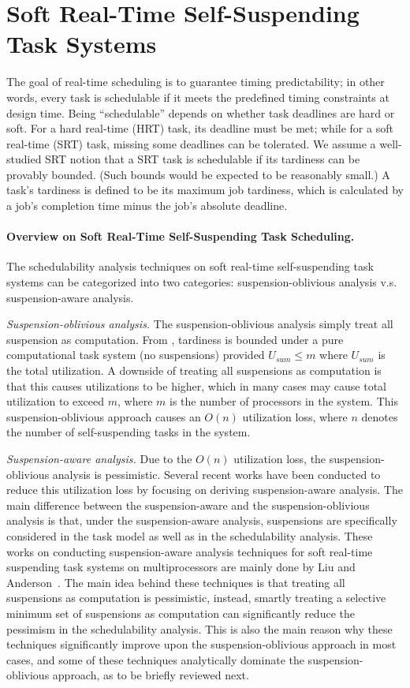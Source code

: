 \section{Soft Real-Time Self-Suspending Task Systems}

The goal of real-time scheduling is to guarantee timing predictability; in other words, every task is schedulable if it meets the predefined timing constraints at design time. Being ``schedulable'' depends on whether task deadlines are hard or soft. 
For a hard real-time (HRT) task, its deadline must be met; while for a soft real-time (SRT) task, missing some deadlines can be tolerated. We assume a well-studied SRT notion that a SRT task is schedulable if its tardiness can be provably bounded. (Such bounds would be expected to be reasonably small.) A task's tardiness is defined to be its maximum job tardiness, which is calculated by a job's completion time minus the job's absolute deadline.

\paragraph{Overview on Soft Real-Time Self-Suspending Task Scheduling.}
The schedulability analysis techniques on soft real-time self-suspending task systems can be categorized into two categories: suspension-oblivious analysis v.s. suspension-aware analysis.

\textit{Suspension-oblivious analysis.} The suspension-oblivious analysis simply treat all suspension as computation. From \cite{Devi2005,Leontyev072}, tardiness is bounded under a pure computational task system (no suspensions) provided $U_{sum} \leq m$ where $U_{sum}$ is the total utilization. A downside of treating all suspensions as computation is that this causes utilizations to be higher, which in many cases may cause total utilization to exceed $m$, where $m$ is the number of processors in the system.  This suspension-oblivious approach causes an $O(n)$ utilization loss, where $n$ denotes the number of self-suspending tasks in the system. 

\textit{Suspension-aware analysis.} Due to the $O(n)$ utilization loss, the suspension-oblivious analysis is pessimistic. Several recent works have been conducted to reduce this utilization loss by focusing on deriving suspension-aware analysis. The main difference between the suspension-aware and the suspension-oblivious analysis is that, under the suspension-aware analysis, suspensions are specifically considered in the task model as well as in the schedulability analysis. These works on conducting suspension-aware analysis techniques for soft real-time suspending task systems on multiprocessors are mainly done by Liu and Anderson~\cite{Liu3,Liu4,Liu5,Liu9,Liu11}. The main idea behind these techniques is that treating all suspensions as computation is pessimistic, instead, smartly treating a selective minimum set of suspensions as computation can significantly reduce the pessimism in the schedulability analysis. This is also the main reason why these techniques significantly improve upon the suspension-oblivious approach in most cases, and some of these techniques analytically dominate the suspension-oblivious approach, as to be briefly reviewed next.

